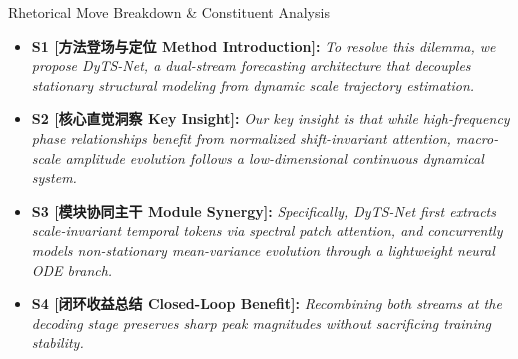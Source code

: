 \begin{TipBox}{Rhetorical Move Breakdown \& Constituent Analysis}
\begin{itemize}[leftmargin=1.5em]
  \item \textbf{S1 [方法登场与定位 Method Introduction]:} \textit{To resolve this dilemma, we propose DyTS-Net, a dual-stream forecasting architecture that decouples stationary structural modeling from dynamic scale trajectory estimation.}\par{}
  \item \textbf{S2 [核心直觉洞察 Key Insight]:} \textit{Our key insight is that while high-frequency phase relationships benefit from normalized shift-invariant attention, macro-scale amplitude evolution follows a low-dimensional continuous dynamical system.}\par{}
  \item \textbf{S3 [模块协同主干 Module Synergy]:} \textit{Specifically, DyTS-Net first extracts scale-invariant temporal tokens via spectral patch attention, and concurrently models non-stationary mean-variance evolution through a lightweight neural ODE branch.}\par{}
  \item \textbf{S4 [闭环收益总结 Closed-Loop Benefit]:} \textit{Recombining both streams at the decoding stage preserves sharp peak magnitudes without sacrificing training stability.}\par{}
\end{itemize}
\end{TipBox}
\medskip
